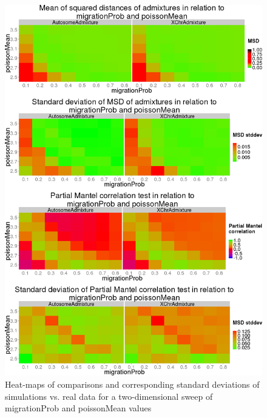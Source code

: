 \documentclass[a4paper,12pt]{report}
\begin{document}
\begin{figure}[ht]
	\centering
	\includegraphics[scale=0.31]{../data/sensit-comp-2d.png}
	\caption{Heat-maps of comparisons and corresponding standard deviations of simulations vs. real data for a two-dimensional sweep of migrationProb and poissonMean values}
	\label{app:sensit-comp-2d}
\end{figure}

\end{document}
